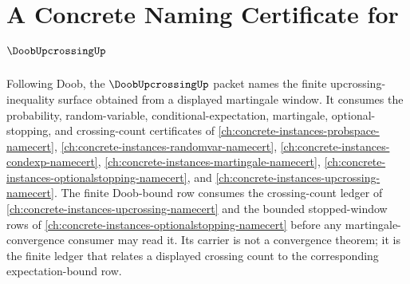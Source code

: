 \chapter{A Concrete Naming Certificate for $\DoobUpcrossingUp$}
\label{ch:concrete-instances-doob-upcrossing-namecert}

Following Doob, the $\DoobUpcrossingUp$ packet names the finite upcrossing-inequality surface obtained from a displayed martingale window. It consumes the probability, random-variable, conditional-expectation, martingale, optional-stopping, and crossing-count certificates of \autoref{ch:concrete-instances-probspace-namecert}, \autoref{ch:concrete-instances-randomvar-namecert}, \autoref{ch:concrete-instances-condexp-namecert}, \autoref{ch:concrete-instances-martingale-namecert}, \autoref{ch:concrete-instances-optionalstopping-namecert}, and \autoref{ch:concrete-instances-upcrossing-namecert}. The finite Doob-bound row consumes the crossing-count ledger of \autoref{ch:concrete-instances-upcrossing-namecert} and the bounded stopped-window rows of \autoref{ch:concrete-instances-optionalstopping-namecert} before any martingale-convergence consumer may read it. Its carrier is not a convergence theorem; it is the finite ledger that relates a displayed crossing count to the corresponding expectation-bound row.

